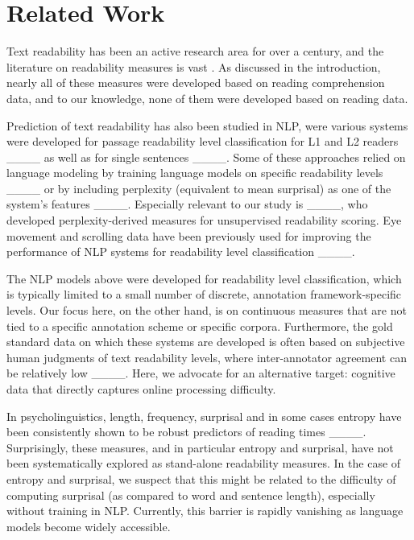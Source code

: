 \section{Related Work}
Text readability has been an active research area for over a century, and the literature on readability measures is vast \cite[see][for surveys]{chall1958,crossley2011text,collins2014computational}.
As discussed in the introduction, nearly all of these measures were developed based on reading comprehension data, and to our knowledge, none of them were developed based on reading data. 

Prediction of text readability has also been studied in NLP, were various systems were developed for passage readability level classification for L1 and L2 readers ____ as well as for single sentences ____. Some of these approaches relied on language modeling by training language models on specific readability levels ____ or by including perplexity (equivalent to mean surprisal) as one of the system's features ____. Especially relevant to our study is ____, who developed perplexity-derived measures for unsupervised readability scoring. Eye movement and scrolling data have been previously used for improving the performance of NLP systems for readability level classification ____. 

The NLP models above were developed for readability level classification, which is typically limited to a small number of discrete, annotation framework-specific levels. Our focus here, on the other hand, is on continuous measures that are not tied to a specific annotation scheme or specific corpora. 
Furthermore, the gold standard data on which these systems are developed is often based on subjective human judgments of text readability levels, where inter-annotator agreement can be relatively low ____. Here,  we advocate for an alternative target: cognitive data that directly captures online processing difficulty.

In psycholinguistics, length, frequency, surprisal and in some cases entropy have been consistently shown to be robust predictors of reading times ____. Surprisingly, these measures, and in particular entropy and surprisal, have not been systematically explored as stand-alone readability measures. In the case of entropy and surprisal, we suspect that this might be related to the difficulty of computing surprisal (as compared to word and sentence length), especially without training in NLP. Currently, this barrier is rapidly vanishing as language models become widely accessible.


